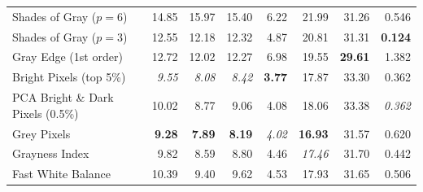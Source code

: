 \begin{longtable}{@{}>{\raggedright\arraybackslash}p{6.8cm}rrrrrrr@{}}
Shades of Gray ($p=6$)~\cite{shades_of_gray} & 14.85 & 15.97 & 15.40 & 6.22 & 21.99 & 31.26 & 0.546 \\
Shades of Gray ($p=3$)~\cite{shades_of_gray} & 12.55 & 12.18 & 12.32 & 4.87 & 20.81 & 31.31 & \textbf{0.124} \\
Gray Edge (1st order)~\cite{gray_edge} & 12.72 & 12.02 & 12.27 & 6.98 & 19.55 & \textbf{29.61} & 1.382 \\
Bright Pixels (top 5\%)~\cite{bright_pixels} & \textit{9.55} & \textit{8.08} & \textit{8.42} & \textbf{3.77} & 17.87 & 33.30 & 0.362 \\
PCA Bright \& Dark Pixels (0.5\%)~\cite{cheng2014illuminant} & 10.02 & 8.77 & 9.06 & 4.08 & 18.06 & 33.38 & \textit{0.362} \\
Grey Pixels~\cite{yangGrayPixels} & \textbf{9.28} & \textbf{7.89} & \textbf{8.19} & \textit{4.02} & \textbf{16.93} & 31.57 & 0.620 \\
Grayness Index~\cite{qianFindingGrayPixels} & 9.82 & 8.59 & 8.80 & 4.46 & \textit{17.46} & 31.70 & 0.442 \\
Fast White Balance~\cite{fast_wb_greyness} & 10.39 & 9.40 & 9.62 & 4.53 & 17.93 & 31.65 & 0.506 \\
\end{longtable}
\endgroup

